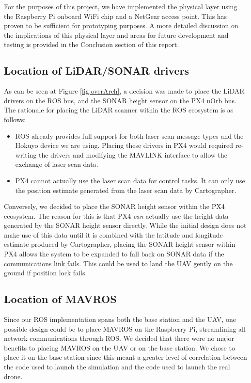 \documentclass[capstone_report.tex]{subfiles}
\begin{document}
For the purposes of this project, we have implemented the physical layer using the Raspberry Pi onboard WiFi chip and a NetGear access point. This has proven to be sufficient for prototyping purposes. A more detailed discussion on the implications of this physical layer and areas for future development and testing is provided in the Conclusion section of this report.


\subsection{Location of LiDAR/SONAR drivers}
As can be seen at Figure \ref{fig:overArch}, a decision was made to place the LiDAR drivers on the ROS bus, and the SONAR height sensor on the PX4 uOrb bus. The rationale for placing the LiDAR scanner within the ROS ecosystem is as follows:

\begin{itemize}
	\item ROS already provides full support for both laser scan message types and the Hokuyo device we are using. Placing these drivers in PX4 would required re-writing the drivers and modifying the MAVLINK interface to allow the exchange of laser scan data.
	\item PX4 cannot actually use the laser scan data for control tasks. It can only use the position estimate generated from the laser scan data by Cartographer.
\end{itemize}

Conversely, we decided to place the SONAR height sensor within the PX4 ecosystem. The reason for this is that PX4 \emph{can} actually use the height data generated by the SONAR height sensor directly. While the initial design does not make use of this data until it is combined with the latitude and longitude estimate produced by Cartographer, placing the SONAR height sensor within PX4 allows the system to be expanded to fall back on SONAR data if the communications link fails. This could be used to land the UAV gently on the ground if position lock fails.

\subsection{Location of MAVROS}
Since our ROS implementation spans both the base station and the UAV, one possible design could be to place MAVROS on the Raspberry Pi, streamlining all network communications through ROS. We decided that there were no major benefits to placing MAVROS on the UAV or on the base station. We chose to place it on the base station since this meant a greater level of correlation between the code used to launch the simulation and the code used to launch the real drone.
\end{document}
